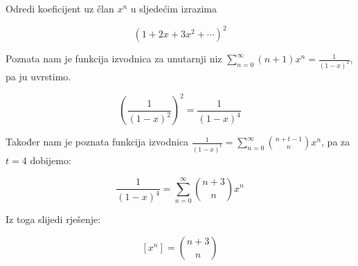 \documentclass[exam.tex]{subfiles}
\begin{document}
	Odredi koeficijent uz član \( x^n \) u sljedećim izrazima
	
	\[ (1 + 2x + 3x^2 + \cdots)^2 \]
	
	Poznata nam je funkcija izvodnica za unutarnji niz \( \sum\limits^\infty_{n=0} (n + 1) x^n = \frac{1}{(1 - x)^2} \), pa ju uvrstimo.
	
	\[ \left ( \frac{1}{(1 - x)^2} \right )^2 = \frac{1}{(1 - x)^4} \]
	
	Također nam je poznata funkcija izvodnica \( \frac{1}{(1 - x)^t} = \sum\limits^\infty_{n=0} \binom{n + t - 1}{n} x^n \), pa za \( t = 4 \) dobijemo: 
	
	\[ \frac{1}{(1 - x)^4} = \sum\limits^\infty_{n=0} \binom{n + 3}{n} x^n \]
	
	Iz toga slijedi rješenje:
	
	\[ [x^n] = \binom{n + 3}{n} \]
\end{document}
